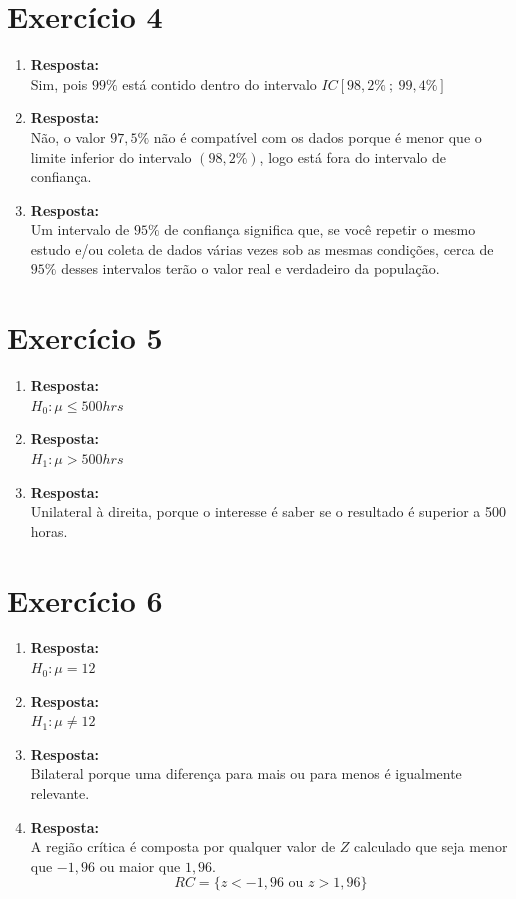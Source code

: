 \documentclass[11pt, a4paper]{article}
\begin{document}
\section{Exercício 4}
\begin{enumerate}[label=\alph*)]
    \item \textbf{Resposta:}\\
    Sim, pois $99\%$ está contido dentro do intervalo $IC[98,2\%\:;\:99,4\%]$
    
    \item \textbf{Resposta:}\\
    Não, o valor $97,5\%$ não é compatível com os dados porque é menor que o limite inferior do intervalo $(98,2\%)$, logo está fora do intervalo de confiança.
    
    \item \textbf{Resposta:}\\
    Um intervalo de $95\%$ de confiança significa que, se você repetir o mesmo estudo e/ou coleta de dados várias vezes sob as mesmas condições, cerca de $95\%$ desses intervalos terão o valor real e verdadeiro da população. 
\end{enumerate}

\section{Exercício 5}
\begin{enumerate}[label=\alph*)]
    \item \textbf{Resposta:}\\
    $H_0:\mu \leq 500hrs$ 
    
    \item \textbf{Resposta:}\\
    $H_1: \mu > 500hrs$
    
    \item \textbf{Resposta:}\\
    Unilateral à direita, porque o interesse é saber se o resultado é superior a 500 horas.
\end{enumerate}

\section{Exercício 6}
\begin{enumerate}[label=\alph*)]
    \item \textbf{Resposta:}\\
    $H_0: \mu = 12$
    
    \item \textbf{Resposta:}\\
    $H_1: \mu \neq 12$ 
    
    \item \textbf{Resposta:}\\
    Bilateral porque uma diferença para mais ou para menos é igualmente relevante.
    
    \item \textbf{Resposta:}\\
    A região crítica é composta por qualquer valor de $Z$ calculado que seja menor que $-1,96$ ou maior que $1,96$.
    \[
    RC = \{z < -1,96 \text{ ou } z > 1,96\}
    \]
\end{enumerate}
\end{document}
